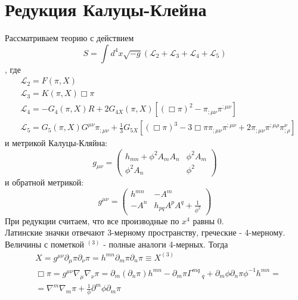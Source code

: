 \documentclass[12pt,a4paper,svgnames]{extarticle}
\begin{document}
\section{Редукция Калуцы-Клейна}
Рассматриваем теорию с действием
\begin{equation}
	S = \int d^4x\sqrt{-g}\left(\mathcal{L}_{2}+\mathcal{L}_{3}+\mathcal{L}_{4}+\mathcal{L}_{5}\right)
\end{equation}
, где
\begin{align}
	& \mathcal{L}_{2} = F\left(\pi, X\right)\\
	& \mathcal{L}_{3} = K\left(\pi, X\right) \Box\pi\\
	& \mathcal{L}_{4} = -G_4(\pi,X)R + 2G_{4X}\left(\pi, X\right)\left[\left(\Box\pi\right)^2 - \pi_{;\mu\nu}\pi^{;\mu\nu}\right]\\
	&\mathcal{L}_{5} = G_5\left(\pi, X\right) G^{\mu\nu}\pi_{;\mu\nu} + \frac{1}{3} G_{5X}\left[\left(\Box\pi\right)^{3} - 3\Box\pi\pi_{;\mu\nu}\pi^{;\mu\nu}+2\pi_{;\mu\nu}\pi^{;\mu\rho}\pi^{\nu}_{;\rho}\right]
\end{align}
и метрикой Калуцы-Кляйна:
\begin{equation}
	g_{\mu\nu} = \begin{pmatrix}
		h_{mn}+\phi^2A_{m}A_{n}&\phi^2A_{m}\\
		\phi^2A_{n}&\phi^2
	\end{pmatrix}
\end{equation}
и обратной метрикой:
	\begin{equation}
	g^{\mu\nu} = \begin{pmatrix}
		h^{mn}&-A^{m}\\
		-A^{n}&h_{pq}A^{p}A^{q}+\frac{1}{\phi^2}
	\end{pmatrix}
\end{equation}
При редукции считаем, что все производные по $x^4$ равны 0.\\
Латинские значки отвечают 3-мерному пространству, греческие - 4-мерному. Величины с пометкой ${}^{(3)}$ - полные аналоги 4-мерных.
Тогда 
\begin{align}
	&X= g^{\mu \nu} \partial_{\mu}{\pi} \partial_{\nu}{\pi} = h^{mn} \partial_{m}{\pi} \partial_{n}{\pi}\equiv X^{(3)}\\
	&\Box\pi = g^{\mu \nu} \nabla_{\mu}\nabla_{\nu}\pi = \partial_{m}({\partial_{n}{\pi}}) h^{m n}-\partial_{m}{\pi} \Gamma^{m q}\,_{q}+\partial_{m}{\phi} \partial_{n}{\pi} {\phi}^{-1} h^{m n} =\nonumber\\
	&= \nabla^m\nabla_m\pi + \frac{1}{\phi}\partial^{m}{\phi} \partial_{m}{\pi}
\end{align}
\end{document}
